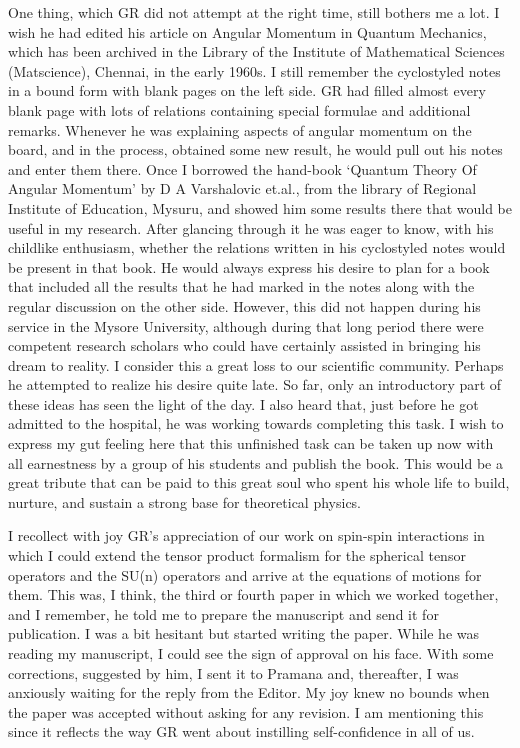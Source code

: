 One thing, which GR did not attempt at the right time, still bothers me a lot. I wish he had edited his article on Angular Momentum in Quantum Mechanics, which has been archived in the Library of the Institute of Mathematical Sciences (Matscience), Chennai, in the early 1960s. I still remember the cyclostyled notes in a bound form with blank pages on the left side. GR had filled almost every blank page with lots of relations containing special formulae and additional remarks. Whenever he was explaining aspects of angular momentum on the board, and in the process, obtained some new result, he would pull out his notes and enter them there. Once I borrowed the hand-book ‘Quantum Theory Of Angular Momentum' by D A Varshalovic et.al., from the library of Regional Institute of Education, Mysuru, and showed him some results there that would be useful in my research. After glancing through it he was eager to know, with his childlike enthusiasm, whether the relations written in his cyclostyled notes would be present in that book. He would always express his desire to plan for a book that included all the results that he had marked in the notes along with the regular discussion on the other side. However, this did not happen during his service in the Mysore University, although during that long period there were competent research scholars who could have certainly assisted in bringing his dream to reality. I consider this a great loss to our scientific community. Perhaps he attempted to realize his desire quite late. So far, only an introductory part of these ideas has seen the light of the day. I also heard that, just before he got admitted to the hospital, he was working towards completing this task. I wish to express my gut feeling here that this unfinished task can be taken up now with all earnestness by a group of his students and publish the book. This would be a great tribute that can be paid to this great soul who spent his whole life to build, nurture, and sustain a strong base for theoretical physics.

I recollect with joy GR's appreciation of our work on spin-spin interactions in which I could extend the tensor product formalism for the spherical tensor operators and the SU(n) operators and arrive at the equations of motions for them. This was, I think, the third or fourth paper in which we worked together, and I remember, he told me to prepare the manuscript and send it for publication. I was a bit hesitant but started writing the paper. While he was reading my manuscript, I could see the sign of approval on his face. With some corrections, suggested by him, I sent it to Pramana and, thereafter, I was anxiously waiting for the reply from the Editor. My joy knew no bounds when the paper was accepted without asking for any revision. I am mentioning this since it reflects the way GR went about instilling self-confidence in all of us.

